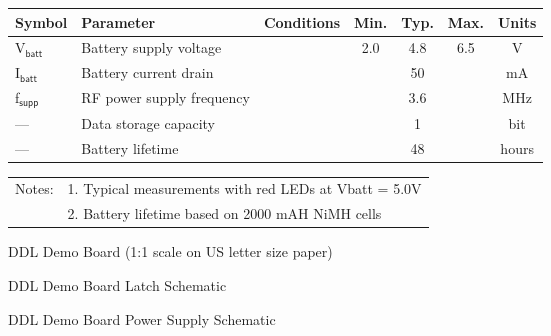 \documentclass{article}
\begin{document}
\captionsetup{singlelinecheck=off}
\begin{figure}[h!]
\centering
{\renewcommand{\arraystretch}{1.2}
\noindent\begin{tabularx}{\textwidth}{ C | X | c | c | c | c | c}
  \hline
  \textbf{Symbol} & \textbf{Parameter} & \textbf{Conditions} & \textbf{Min.} &
  \textbf{Typ.} & \textbf{Max.} &  \textbf{Units} \\ \hline
  V$_\textsf{batt}$ & Battery supply voltage & & 2.0 & 4.8 & 6.5 &\si{\volt}\\
  \hline
  I$_\textsf{batt}$ & Battery current drain & & & 50 & &\si{\milli \ampere}\\
  \hline
  f$_\textsf{supp}$ & RF power supply frequency & & & 3.6 & &\si{\mega \hertz}\\
  \hline
  --- & Data storage capacity & & & 1 & &bit\\
  \hline
  --- & Battery lifetime & & & 48 & &\si{hours}\\
  \hline
\end{tabularx}}

\raggedright
\begin{tabular}{r l}
Notes: & 1. Typical measurements with red LEDs at Vbatt = 5.0V \\
       & 2. Battery lifetime based on 2000 mAH NiMH cells
\end{tabular}

\end{figure}
\captionsetup{singlelinecheck=on}


\FloatBarrier
\clearpage

\begin{figure}[htbp]
\centering
\vspace{8pt}
\caption{DDL Demo Board (1:1 scale on US letter size paper)}
\label{fig:diagram}
\end{figure}

\begin{figure}[htbp]
\centering
\vspace{8pt}
\caption{DDL Demo Board Latch Schematic}
\label{fig:latch}
\end{figure}

\begin{figure}[htbp]
\centering
\vspace{8pt}
\caption{DDL Demo Board Power Supply Schematic}
\label{fig:supply}
\end{figure}
\end{document}
